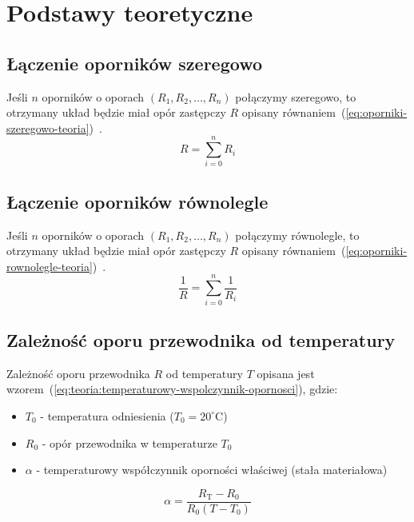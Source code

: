 \documentclass[twocolumn, a4paper, polish, 10pt]{article}
\begin{document}
\section{Podstawy teoretyczne}
\subsection{Łączenie oporników szeregowo}
Jeśli $n$ oporników o oporach $(R_1, R_2, \dots, R_n)$ połączymy szeregowo, to otrzymany układ będzie miał opór zastępczy $R$ opisany równaniem~(\ref{eq:oporniki-szeregowo-teoria})~\cite{pracownia-fizyczna-e3}.
\begin{equation}
    R = \sum_{i=0}^n R_i
    \label{eq:oporniki-szeregowo-teoria}
\end{equation}

\subsection{Łączenie oporników równolegle}
Jeśli $n$ oporników o oporach $(R_1, R_2, \dots, R_n)$ połączymy równolegle, to otrzymany układ będzie miał opór zastępczy $R$ opisany równaniem~(\ref{eq:oporniki-rownolegle-teoria})~\cite{pracownia-fizyczna-e3}.
\begin{equation}
    \frac{1}{R} = \sum_{i=0}^n \frac{1}{R_i}
    \label{eq:oporniki-rownolegle-teoria}
\end{equation}

\subsection{Zależność oporu przewodnika od temperatury}
Zależność oporu przewodnika $R$ od temperatury $T$ opisana jest wzorem~(\ref{eq:teoria:temperaturowy-wspolczynnik-opornosci}), gdzie:
\begin{itemize}
    \item $T_0$ - temperatura odniesienia ($T_0 = 20^{\circ}\mathrm{C}$)
    \item $R_0$ - opór przewodnika w temperaturze $T_0$
    \item $\alpha$ - temperaturowy współczynnik oporności właściwej (stała materiałowa)
\end{itemize}

\begin{equation}
    \alpha = \frac{ R_{\mathrm{T}} - R_0 }{ R_0 \left( T - T_0 \right) }
    \label{eq:teoria:temperaturowy-wspolczynnik-opornosci}
\end{equation}
\end{document}
